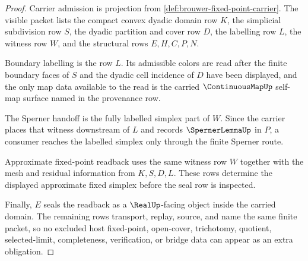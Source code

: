 \begin{proof}
Carrier admission is projection from \autoref{def:brouwer-fixed-point-carrier}. The visible packet lists the compact convex dyadic domain row $K$, the simplicial subdivision row $S$, the dyadic partition and cover row $D$, the labelling row $L$, the witness row $W$, and the structural rows $E,H,C,P,N$.

Boundary labelling is the row $L$. Its admissible colors are read after the finite boundary faces of $S$ and the dyadic cell incidence of $D$ have been displayed, and the only map data available to the read is the carried $\ContinuousMapUp$ self-map surface named in the provenance row.

The Sperner handoff is the fully labelled simplex part of $W$. Since the carrier places that witness downstream of $L$ and records $\SpernerLemmaUp$ in $P$, a consumer reaches the labelled simplex only through the finite Sperner route.

Approximate fixed-point readback uses the same witness row $W$ together with the mesh and residual information from $K,S,D,L$. These rows determine the displayed approximate fixed simplex before the seal row is inspected.

Finally, $E$ seals the readback as a $\RealUp$-facing object inside the carried domain. The remaining rows transport, replay, source, and name the same finite packet, so no excluded host fixed-point, open-cover, trichotomy, quotient, selected-limit, completeness, verification, or bridge data can appear as an extra obligation.
\end{proof}


